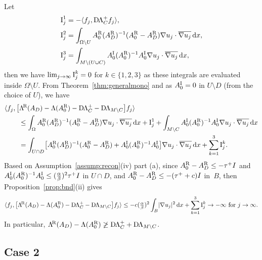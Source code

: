 \documentclass[reqno]{amsart}
\numberwithin{equation}{section}
\numberwithin{figure}{section}
\numberwithin{table}{section}
\theoremstyle{plain}
\theoremstyle{definition}
\theoremstyle{remark}
\newcommand{\abs}[1]{\lvert#1\rvert}
\newcommand{\inner}[1]{\langle#1\rangle}
\newcommand{\di}{\mathrm{d}}   %
\newcommand{\upR}{^{\textup{R}}}
\newcommand{\upI}{^{\textup{I}}}
\newcommand{\uptR}{^{\!\textup{R}}}
\newcommand{\LambdaR}{\Lambda\uptR}
\newcommand{\AR}{A\upR}
\newcommand{\AI}{A\upI}
\newcommand{\DLambda}{\textup{D}\mkern-1.5mu \Lambda}
\begin{document}
	Let 
	\begin{align*}
		\textup{I}^1_j &= -\inner{f_j,\DLambda_C^+ f_j}, \\
		\textup{I}^2_j &= \int_{\Omega\setminus U} \AR_0(\AR_D)^{-1}(\AR_0 - \AR_D)\nabla u_j\cdot\overline{\nabla u_j}\,\di x, \\
		\textup{I}^3_j &= \int_{M\setminus(U\cup C)} \AI_0(\AR_0)^{-1}\AI_0\nabla u_j\cdot\overline{\nabla u_j}\,\di x,
	\end{align*}
	then we have $\lim_{j\to\infty} \textup{I}_j^k = 0$ for $k\in\{1,2,3\}$ as these integrals are evaluated inside $\Omega\setminus U$. From Theorem~\ref{thm:generalmono} and as $\AI_0 = 0$ in $U\setminus D$ (from the choice of $U$), we have
	\begin{align*}
		\inner{f_j,\bigl[ \LambdaR(A_D)-\Lambda(\AR_0)-\DLambda_C^+ - \DLambda_{M\setminus C} \bigr]f_j} \hspace{-6cm}&\\
		&\leq \int_\Omega \AR_0(\AR_D)^{-1}(\AR_0 - \AR_D)\nabla u_j\cdot\overline{\nabla u_j}\,\di x + \textup{I}_j^1  + \int_{M\setminus C} \AI_0(\AR_0)^{-1}\AI_0\nabla u_j\cdot\overline{\nabla u_j}\,\di x \\
		&= \int_{U\cap D} \bigl[\AR_0(\AR_D)^{-1}(\AR_0 - \AR_D) + \AI_0(\AR_0)^{-1}\AI_0 \bigr]\nabla u_j\cdot\overline{\nabla u_j}\,\di x + \sum_{k=1}^3 \textup{I}_j^k.
	\end{align*}
	Based on Assumption~\ref{assump:recon}(iv) part (a), since $\AR_0 - \AR_D \leq -\tau^+ I$ and $\AI_0(\AR_0)^{-1}\AI_0 \leq (\tfrac{\alpha}{\beta})^2\tau^+ I$ in $U\cap D$, and $\AR_0 - \AR_D \leq -(\tau^+ + c) I$ in~$B$, then Proposition~\ref{prop:bnd}(ii) gives
	\begin{equation*}
		\inner{f_j,\bigl[ \LambdaR(A_D)-\Lambda(\AR_0)-\DLambda_C^+ - \DLambda_{M\setminus C} \bigr]f_j} \leq -c(\tfrac{\alpha}{\beta})^2\int_B \abs{\nabla u_j}^2\,\di x + \sum_{k=1}^3 \textup{I}_j^k \to -\infty \text{ for } j\to\infty.
	\end{equation*}
	In particular, $\LambdaR(A_D)-\Lambda(\AR_0) \not\geq \DLambda_C^+ + \DLambda_{M\setminus C}$.
	
	\subsection*{Case 2}
	
\end{document}
